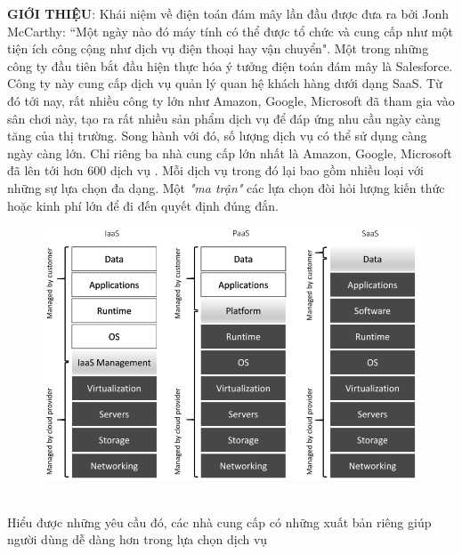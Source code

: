 \documentclass{article}
\begin{document}
\textbf{GIỚI THIỆU}: Khái niệm về điện toán đám mây lần đầu được đưa ra bởi Jonh McCarthy: “Một ngày nào đó máy tính có thể được tổ chức và cung cấp như một tiện ích công cộng như dịch vụ điện thoại hay vận chuyển"\cite{garfinkel1999architects}. Một trong những công ty đầu tiên bắt đầu hiện thực hóa ý tưởng điện toán đám mây là Salesforce. Công ty này cung cấp dịch vụ quản lý quan hệ khách hàng dưới dạng SaaS\footnotemark {}. Từ đó tới nay, rất nhiều công ty lớn như Amazon, Google, Microsoft đã tham gia vào sân chơi này, tạo ra rất nhiều sản phẩm dịch vụ để đáp ứng nhu cầu ngày càng tăng của thị trường. Song hành với đó, số lượng dịch vụ có thể sử dụng càng ngày càng lớn. Chỉ riêng ba nhà cung cấp lớn nhất là Amazon, Google, Microsoft đã lên tới hơn 600 dịch vụ \cite{amazon2023whatis,googlecloud2023product,Azure2023WhatisAzure}. Mỗi dịch vụ trong đó lại bao gồm nhiều loại với những sự lựa chọn đa dạng. Một \textit{"ma trận"} các lựa chọn đòi hỏi lượng kiến thức hoặc kinh phí lớn để đi đến quyết định đúng đắn.
\begin{figure}[h!]
  \centering
  \includegraphics[scale=0.3]{imgs/cloud-services.png}
  \label{fig:cloud-services}
\end{figure} \\
Hiểu được những yêu cầu đó, các nhà cung cấp có những xuất bản riêng \cite{geewax2018google, wittig2018amazon, copeland2015microsoft} giúp người dùng dễ dàng hơn trong lựa chọn dịch vụ


\printbibliography[heading=bibintoc, title = {TÀI LIỆU THAM KHẢO}]
\end{document}
